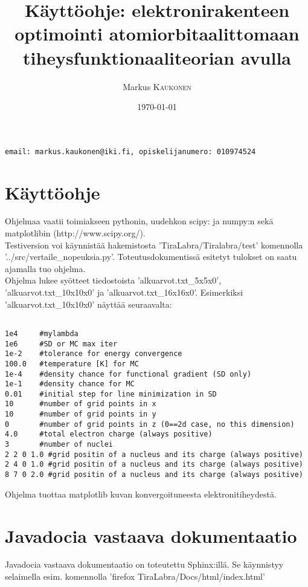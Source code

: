 \documentclass{article}
\title{Käyttöohje: elektronirakenteen optimointi atomiorbitaalittomaan tiheysfunktionaaliteorian avulla} %
\author{Markus \textsc{Kaukonen} %
}
\date{\today} %
\begin{document}
\maketitle %
\hspace{1cm} \texttt{email: markus.kaukonen@iki.fi, opiskelijanumero: 010974524}

\newpage


\section{Käyttöohje}
Ohjelmaa vaatii toimiakseen pythonin, uudehkon scipy: ja numpy:n sekä
matplotlibin (http://www.scipy.org/). \\

Testiversion voi käynnistää hakemistosta 'TiraLabra/Tiralabra/test'
komennolla '../src/vertaile\_nopeuksia.py'. Toteutusdokumentissä
esitetyt tulokset on saatu ajamalla tuo ohjelma.  \\

Ohjelma lukee syötteet tiedostoista 'alkuarvot.txt\_5x5x0',
'alkuarvot.txt\_10x10x0' ja 'alkuarvot.txt\_16x16x0'.
Esimerkiksi 'alkuarvot.txt\_10x10x0' näyttää seuraavalta:\\
\begin{small}
\begin{lstlisting}[frame=single]  % Start your code-block

1e4     #mylambda
1e6     #SD or MC max iter
1e-2    #tolerance for energy convergence
100.0   #temperature [K] for MC
1e-4    #density chance for functional gradient (SD only)
1e-1    #density chance for MC
0.01    #initial step for line minimization in SD
10      #number of grid points in x
10      #number of grid points in y
0       #number of grid points in z (0==2d case, no this dimension)
4.0     #total electron charge (always positive)
3       #number of nuclei
2 2 0 1.0 #grid positin of a nucleus and its charge (always positive)
2 4 0 1.0 #grid positin of a nucleus and its charge (always positive)
8 7 0 2.0 #grid positin of a nucleus and its charge (always positive)
\end{lstlisting}
\end{small}
Ohjelma tuottaa matplotlib kuvan konvergoituneesta elektronitiheydestä. 


\section{Javadocia vastaava dokumentaatio}
Javadocia vastaava dokumentaatio on toteutettu Sphinx:illä.  Se
käynnistyy selaimella esim. komennolla 'firefox
TiraLabra/Docs/html/index.html'
\end{document}
